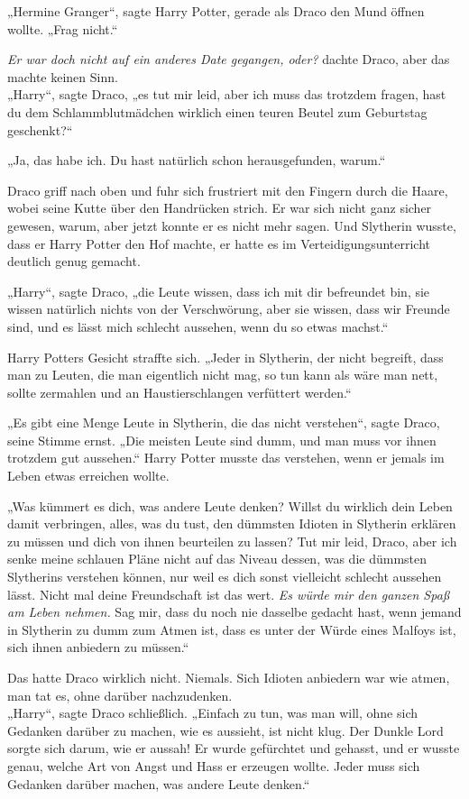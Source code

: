{„Hermine Granger“, sagte Harry Potter, gerade als Draco den Mund öffnen wollte. „Frag nicht.“

\emph{Er war doch nicht auf ein anderes Date gegangen, oder?} dachte Draco, aber das machte keinen Sinn.\\ „Harry“, sagte Draco, „es tut mir leid, aber ich muss das trotzdem fragen, hast du dem Schlammblutmädchen wirklich einen teuren Beutel zum Geburtstag geschenkt?“

„Ja, das habe ich. Du hast natürlich schon herausgefunden, warum.“

Draco griff nach oben und fuhr sich frustriert mit den Fingern durch die Haare, wobei seine Kutte über den Handrücken strich. Er war sich nicht ganz sicher gewesen, warum, aber jetzt konnte er es nicht mehr sagen. Und Slytherin wusste, dass er Harry Potter den Hof machte, er hatte es im Verteidigungsunterricht deutlich genug gemacht.

„Harry“, sagte Draco, „die Leute wissen, dass ich mit dir befreundet bin, sie wissen natürlich nichts von der Verschwörung, aber sie wissen, dass wir Freunde sind, und es lässt mich schlecht aussehen, wenn du so etwas machst.“

Harry Potters Gesicht straffte sich. „Jeder in Slytherin, der nicht begreift, dass man zu Leuten, die man eigentlich nicht mag, so tun kann als wäre man nett, sollte zermahlen und an Haustierschlangen verfüttert werden.“

„Es gibt eine Menge Leute in Slytherin, die das nicht verstehen“, sagte Draco, seine Stimme ernst. „Die meisten Leute sind dumm, und man muss vor ihnen trotzdem gut aussehen.“ Harry Potter musste das verstehen, wenn er jemals im Leben etwas erreichen wollte.

„Was kümmert es dich, was andere Leute denken? Willst du wirklich dein Leben damit verbringen, alles, was du tust, den dümmsten Idioten in Slytherin erklären zu müssen und dich von ihnen beurteilen zu lassen? Tut mir leid, Draco, aber ich senke meine schlauen Pläne nicht auf das Niveau dessen, was die dümmsten Slytherins verstehen können, nur weil es dich sonst vielleicht schlecht aussehen lässt. Nicht mal deine Freundschaft ist das wert. \emph{Es würde mir den ganzen Spaß am Leben nehmen.} Sag mir, dass du noch nie dasselbe gedacht hast, wenn jemand in Slytherin zu dumm zum Atmen ist, dass es unter der Würde eines Malfoys ist, sich ihnen anbiedern zu müssen.“

Das hatte Draco wirklich nicht. Niemals. Sich Idioten anbiedern war wie atmen, man tat es, ohne darüber nachzudenken.\\ „Harry“, sagte Draco schließlich. „Einfach zu tun, was man will, ohne sich Gedanken darüber zu machen, wie es aussieht, ist nicht klug. Der Dunkle Lord sorgte sich darum, wie er aussah! Er wurde gefürchtet und gehasst, und er wusste genau, welche Art von Angst und Hass er erzeugen wollte. Jeder muss sich Gedanken darüber machen, was andere Leute denken.“

}
